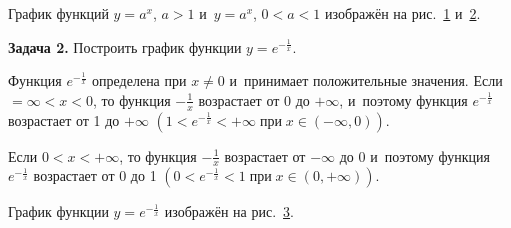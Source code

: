 График функций $y = a^{x}$, $a > 1$ и~$y = a^{x}$, $0 < a < 1$
изображён на рис.\ \ref{fig:4_3_5_18} и~\ref{fig:4_3_5_19}.

\begin{figure}\label{fig:4_3_5_18} 
\end{figure}
\begin{figure}\label{fig:4_3_5_19} 
\end{figure}

\textbf{Задача 2.}\label{ex:4_3_5_2} Построить график функции $y = e^{-\frac{1}{x}}$.

Функция $e^{-\frac{1}{x}}$ определена при $x \ne 0$ и~принимает положительные значения.
Если $=\infty < x < 0$, то функция $\displaystyle -\frac{1}{x}$
возрастает от 0 до $+\infty$, и~поэтому функция $e^{-\frac{1}{x}}$
возрастает от 1 до $+\infty$
$\left( 1 < e^{-\frac{1}{x}} < +\infty \; \text{при} \; x \in (-\infty, 0) \right)$.

Если $0 < x < +\infty$, то функция $\displaystyle -\frac{1}{x}$ возрастает от $-\infty$
до 0 и~поэтому функция $e^{-\frac{1}{x}}$ возрастает от 0 до 1
$\left( 0 < e^{-\frac{1}{x}} < 1 \; \text{при} \; x \in (0, +\infty) \right)$.

График функции $y = e^{-\frac{1}{x}}$ изображён на рис.\ \ref{fig:4_3_5_20}.

\begin{figure}\label{fig:4_3_5_20}
\end{figure}

